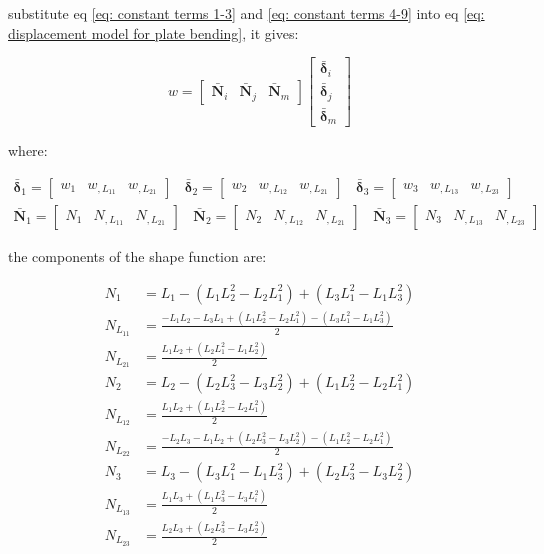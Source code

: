 substitute eq \ref{eq: constant terms 1-3} and \ref{eq: constant terms 4-9} into eq \ref{eq: displacement model for plate bending}, it gives:

\begin{equation} \label{eq: nodal displacements definition}
w = \begin{bmatrix}
\bar{\mathbf{N}}_i & \bar{\mathbf{N}}_j & \bar{\mathbf{N}}_m
\end{bmatrix}
 \begin{bmatrix}
 \bar{\mathbf{\delta}}_i \\ 
 \bar{\mathbf{\delta}}_j \\ 
 \bar{\mathbf{\delta}}_m
 \end{bmatrix} 
\end{equation}

where:

\begin{equation*}
	\begin{split}
	\bar{\mathbf{\delta}}_1 = \begin{bmatrix}
		w_1 & w_{,L_{11}} & w_{,L_{21}}
		\end{bmatrix}~~~~\bar{\mathbf{\delta}}_2 = \begin{bmatrix}
		w_2 & w_{,L_{12}} & w_{,L_{21}} \end{bmatrix}~~~~\bar{\mathbf{\delta}}_3 = \begin{bmatrix}	w_3 & w_{,L_{13}} & w_{,L_{23}} \end{bmatrix} \\
		\bar{\mathbf{N}}_1 = \begin{bmatrix}
			N_1 & N_{,L_{11}} & N_{,L_{21}}
		\end{bmatrix}~~~~\bar{\mathbf{N}}_2 = \begin{bmatrix}
		N_2 & N_{,L_{12}} & N_{,L_{21}} \end{bmatrix}~~~~\bar{\mathbf{N}}_3 = \begin{bmatrix}	N_3 & N_{,L_{13}} & N_{,L_{23}} \end{bmatrix}
	\end{split}	
\end{equation*}

the components of the shape function are:

\begin{align*}
	N_1 &= L_1 -(L_1 L_2^2 - L_2 L_1^2) + (L_3 L_1^2 - L_1 L_3^2) \\
	N_{L_{11}} &= \frac{-L_1 L_2 - L_3 L_1 + (L_1 L_2^2 - L_2 L_1^2) - (L_3 L_1^2 - L_1 L_3^2)}{2} \\
	N_{L_{21}} &= \frac{L_1 L_2 + (L_2 L_1^2 - L_1 L_2^2)}{2} \\
	N_{2} &= L_2 -(L_2 L_3^2-L_3 L_2^2) + (L_1 L_2^2 -L_2 L_1^2) \\
	N_{L_{12}} &= \frac{L_1 L_2 + (L_1 L_2^2 - L_2 L_1^2)}{2} \\
	N_{L_{22}} &= \frac{-L_2 L_3 - L_1 L_2 +(L_2 L_3^2-L_3 L_2^2)- (L_1 L_2^2 - L_2 L_1^2)}{2} \\
	N_3 &= L_3 - (L_3 L_1^2 -L_1 L_3^2) + (L_2 L_3^2 - L_3 L_2^2) \\
	N_{L_{13}} &= \frac{L_1 L_3 + (L_1 L_3^2 - L_3 L_i^2)}{2} \\
	N_{L_{23}} &= \frac{L_2 L_3 + (L_2 L_3^2 - L_3 L_2^2)}{2}
\end{align*}

